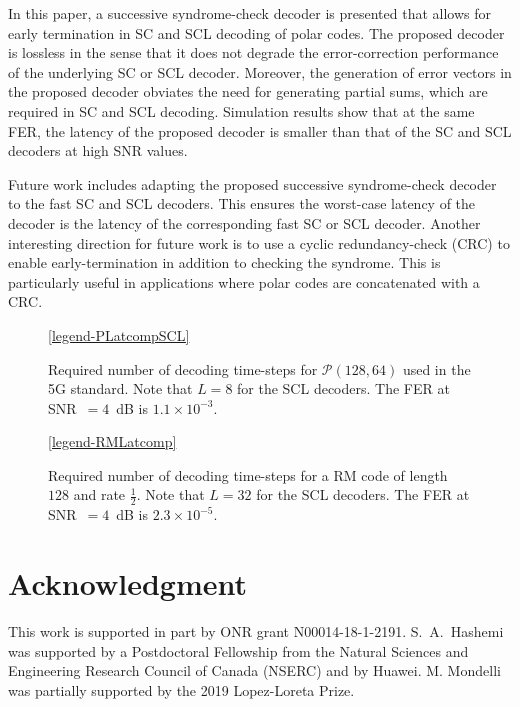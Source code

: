 \documentclass[conference]{IEEEtran}
\begin{document}
In this paper, a successive syndrome-check decoder is presented that allows for early termination in SC and SCL decoding of polar codes. The proposed decoder is lossless in the sense that it does not degrade the error-correction performance of the underlying SC or SCL decoder. Moreover, the generation of error vectors in the proposed decoder obviates the need for generating partial sums, which are required in SC and SCL decoding. Simulation results show that at the same FER, the latency of the proposed decoder is smaller than that of the SC and SCL decoders at high SNR values.

Future work includes adapting the proposed successive syndrome-check decoder to the fast SC and SCL decoders. This ensures the worst-case latency of the decoder is the latency of the corresponding fast SC or SCL decoder. Another interesting direction for future work is to use a cyclic redundancy-check (CRC) to enable early-termination in addition to checking the syndrome. This is particularly useful in applications where polar codes are concatenated with a CRC.

\begin{figure}[t]
    \centering
    
    \ref{legend-PLatcompSCL}
    \caption{Required number of decoding time-steps for $\mathcal{P}(128,64)$ used in the 5G standard. Note that $L=8$ for the SCL decoders. The FER at SNR~$=4$~dB is $1.1\times 10^{-3}$.}
    \label{fig:TvsSTime128SCL}
\end{figure}

\begin{figure}[t]
    \centering
    
    \ref{legend-RMLatcomp}
    \caption{Required number of decoding time-steps for a RM code of length $128$ and rate $\frac{1}{2}$. Note that $L=32$ for the SCL decoders. The FER at SNR~$=4$~dB is $2.3\times 10^{-5}$.}
    \label{fig:TvsSTime128RM}
\end{figure}

\section*{Acknowledgment}

This work is supported in part by ONR grant N00014-18-1-2191. S.~A.~Hashemi was supported by a Postdoctoral Fellowship from the Natural Sciences and Engineering Research Council of Canada (NSERC) and by Huawei. M. Mondelli was partially supported by the 2019 Lopez-Loreta Prize.
\end{document}
